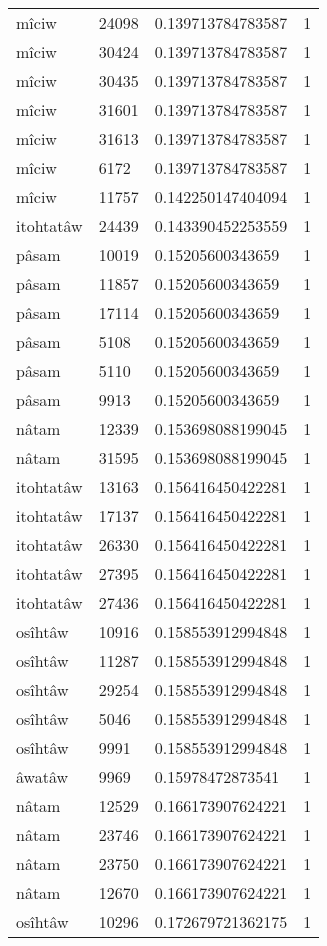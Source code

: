 \begin{longtable}{llll}
mîciw & 24098 & 0.139713784783587 & 1 \\
mîciw & 30424 & 0.139713784783587 & 1 \\
mîciw & 30435 & 0.139713784783587 & 1 \\
mîciw & 31601 & 0.139713784783587 & 1 \\
mîciw & 31613 & 0.139713784783587 & 1 \\
mîciw & 6172 & 0.139713784783587 & 1 \\
mîciw & 11757 & 0.142250147404094 & 1 \\
itohtatâw & 24439 & 0.143390452253559 & 1 \\
pâsam & 10019 & 0.15205600343659 & 1 \\
pâsam & 11857 & 0.15205600343659 & 1 \\
pâsam & 17114 & 0.15205600343659 & 1 \\
pâsam & 5108 & 0.15205600343659 & 1 \\
pâsam & 5110 & 0.15205600343659 & 1 \\
pâsam & 9913 & 0.15205600343659 & 1 \\
nâtam & 12339 & 0.153698088199045 & 1 \\
nâtam & 31595 & 0.153698088199045 & 1 \\
itohtatâw & 13163 & 0.156416450422281 & 1 \\
itohtatâw & 17137 & 0.156416450422281 & 1 \\
itohtatâw & 26330 & 0.156416450422281 & 1 \\
itohtatâw & 27395 & 0.156416450422281 & 1 \\
itohtatâw & 27436 & 0.156416450422281 & 1 \\
osîhtâw & 10916 & 0.158553912994848 & 1 \\
osîhtâw & 11287 & 0.158553912994848 & 1 \\
osîhtâw & 29254 & 0.158553912994848 & 1 \\
osîhtâw & 5046 & 0.158553912994848 & 1 \\
osîhtâw & 9991 & 0.158553912994848 & 1 \\
âwatâw & 9969 & 0.15978472873541 & 1 \\
nâtam & 12529 & 0.166173907624221 & 1 \\
nâtam & 23746 & 0.166173907624221 & 1 \\
nâtam & 23750 & 0.166173907624221 & 1 \\
nâtam & 12670 & 0.166173907624221 & 1 \\
osîhtâw & 10296 & 0.172679721362175 & 1 \\

\end{longtable}

